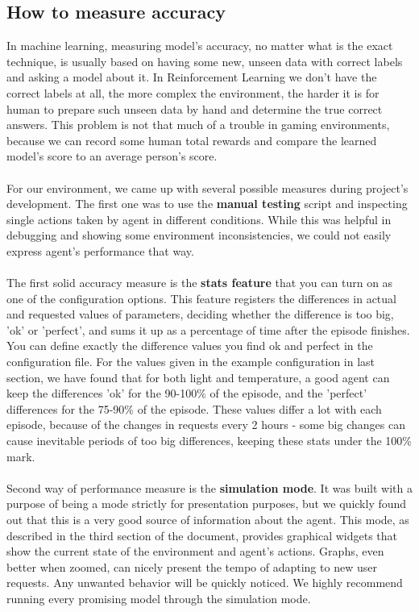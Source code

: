 \documentclass{article}
\begin{document}
\subsection{How to measure accuracy}
In machine learning, measuring model's accuracy, no matter what is the exact technique, is usually based on having some new, unseen data with correct labels and asking a model about it. In Reinforcement Learning we don't have the correct labels at all, the more complex the environment, the harder it is for human to prepare such unseen data by hand and determine the true correct answers. This problem is not that much of a trouble in gaming environments, because we can record some human total rewards and compare the learned model's score to an average person's score.
\\\\
For our environment, we came up with several possible measures during project's development. The first one was to use the \textbf{manual testing} script and inspecting single actions taken by agent in different conditions. While this was helpful in debugging and showing some environment inconsistencies, we could not easily express agent's performance that way. 
\\\\
The first solid accuracy measure is the \textbf{stats feature} that you can turn on as one of the configuration options. This feature registers the differences in actual and requested values of parameters, deciding whether the difference is too big, 'ok' or 'perfect', and sums it up as a percentage of time after the episode finishes. You can define exactly the difference values you find ok and perfect in the configuration file. For the values given in the example configuration in last section, we have found that for both light and temperature, a good agent can keep the differences 'ok' for the 90-100\% of the episode, and the 'perfect' differences for the 75-90\% of the episode. These values differ a lot with each episode, because of the changes in requests every 2 hours - some big changes can cause inevitable periods of too big differences, keeping these stats under the 100\% mark.
\\\\
Second way of performance measure is the \textbf{simulation mode}. It was built with a purpose of being a mode strictly for presentation purposes, but we quickly found out that this is a very good source of information about the agent. This mode, as described in the third section of the document, provides graphical widgets that show the current state of the environment and agent's actions. Graphs, even better when zoomed, can nicely present the tempo of adapting to new user requests. Any unwanted behavior will be quickly noticed. We highly recommend running every promising model through the simulation mode.
\end{document}
